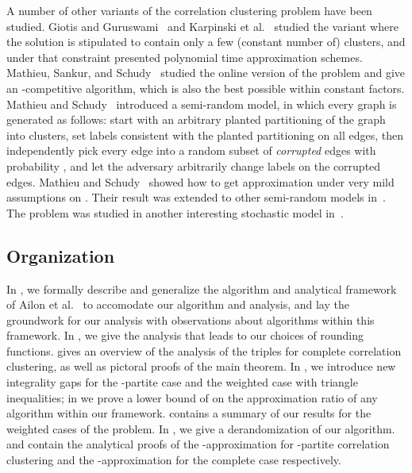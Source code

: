 \documentclass[11pt]{article}
\theoremstyle{definition}
\theoremstyle{remark}
\begin{document}
A number of other variants of the correlation clustering problem have
been studied. Giotis and Guruswami~\cite{Giotis06} and Karpinski et
al.~\cite{KS09} studied the variant where the solution is stipulated
to contain only a few (constant number of) clusters, and under that
constraint presented polynomial time approximation schemes. Mathieu,
Sankur, and Schudy~\cite{MSS10} studied the online version of the
problem and give an -competitive algorithm, which is also the
best possible within constant factors. Mathieu and Schudy~\cite{MS10}
introduced a semi-random model, in which every
graph is generated as follows: start with an arbitrary planted partitioning
of the graph into clusters, set labels consistent with
the planted partitioning on all edges, then independently pick every edge into a random subset
of \textit{corrupted} edges with probability ,
and let the adversary arbitrarily change labels on the corrupted edges.
Mathieu and Schudy~\cite{MS10} showed how to get  approximation under very mild assumptions on .
Their result was extended to other semi-random models in~\cite{MMV, Yudong}.
The problem was studied in another interesting stochastic model in~\cite{AL09}.

\subsection{Organization}




In , we formally describe and generalize the algorithm and
analytical framework of Ailon et al.~\cite{ACN08} to accomodate our algorithm and analysis, and lay
the groundwork for our analysis with observations about algorithms within this
framework.
In , we give the analysis that leads to our choices
of rounding functions.  gives an overview of the analysis
of the triples for complete correlation clustering, as well as pictoral proofs of the main
theorem. In , we introduce new integrality gaps for the -partite
case and the weighted case with triangle inequalities; in  we
prove a lower bound of  on the approximation ratio of any algorithm
within our framework.
 contains a summary of our results for the weighted cases of the problem.
In , we give a derandomization of our algorithm.
 and  contain the analytical
proofs of the -approximation for -partite correlation clustering and the
-approximation for the complete case respectively.
 
\end{document}
